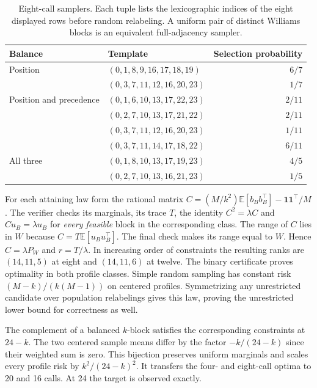 \begin{table}[h]
\centering
\caption{Eight-call samplers. Each tuple lists the lexicographic indices of the eight displayed rows
before random relabeling. A uniform pair of distinct Williams blocks is an equivalent full-adjacency sampler.}
\label{tab:eight-templates}
\begin{tabular}{llr}
\toprule
Balance & Template & Selection probability \\
\midrule
Position & $(0,1,8,9,16,17,18,19)$ & $6/7$ \\
         & $(0,3,7,11,12,16,20,23)$ & $1/7$ \\
Position and precedence & $(0,1,6,10,13,17,22,23)$ & $2/11$ \\
         & $(0,2,7,10,13,17,21,22)$ & $2/11$ \\
         & $(0,3,7,11,12,16,20,23)$ & $1/11$ \\
         & $(0,3,7,11,14,17,18,22)$ & $6/11$ \\
All three & $(0,1,8,10,13,17,19,23)$ & $4/5$ \\
         & $(0,2,7,10,13,16,21,23)$ & $1/5$ \\
\bottomrule
\end{tabular}
\end{table}

For each attaining law form the rational matrix
$C=(M/k^2)\mathbb E[b_B b_B^\top]-\mathbf1\mathbf1^\top/M$.
The verifier checks its marginals, its trace $T$, the identity
$C^2=\lambda C$ and $Cu_B=\lambda u_B$ for \emph{every feasible}
block in the corresponding class. The range of $C$ lies in $W$
because $C=T\mathbb E[u_Bu_B^\top]$. The final check makes its range
equal to $W$. Hence $C=\lambda P_W$ and
$r=T/\lambda$. In increasing order of constraints the resulting ranks
are $(14,11,5)$ at eight and $(14,11,6)$ at twelve. The binary
certificate proves optimality in both profile classes. Simple random
sampling has constant risk $(M-k)/(k(M-1))$ on centered profiles.
Symmetrizing any unrestricted candidate over population relabelings
gives this law, proving the unrestricted lower bound for correctness
as well.

The complement of a balanced $k$-block satisfies the corresponding
constraints at $24-k$. The two centered sample means differ by the
factor $-k/(24-k)$ since their weighted sum is zero. This bijection
preserves uniform marginals and scales every profile risk by
$k^2/(24-k)^2$. It transfers the four- and eight-call optima to
20 and 16 calls. At 24 the target is observed exactly.

